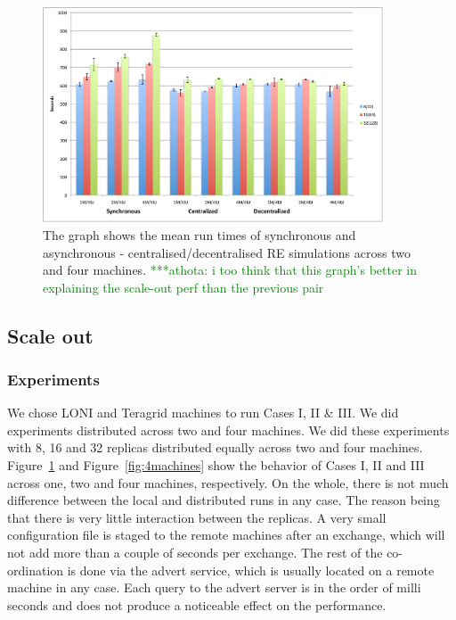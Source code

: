 \documentclass{rspublic}
\newcommand{\athotanote}[1]{ {\textcolor{green} { ***athota: #1 }}}
\newcommand{\athotanote}[1]{}
\begin{document}
%
\begin{figure}
\centering
\includegraphics[width=0.9\textwidth]{../data/scaleout.pdf}
\caption{\small The graph shows the mean run times of synchronous and
  asynchronous - centralised/decentralised RE simulations across two
  and four machines.\athotanote{i too think that this graph's better
    in explaining the scale-out perf than the previous pair} }
\label{fig:2machines}
\vspace{-1em}
\end{figure}

\subsection{Scale out}
\subsubsection{Experiments}
We chose LONI and Teragrid machines to run Cases I, II \& III. We did experiments distributed across two and four machines. We did these experiments with 8, 16 and 32 replicas distributed equally across two and four machines. 
Figure~\ref{fig:2machines} and Figure~\ref{fig:4machines} show the behavior of Cases I, II and III across one, two and four machines, respectively. On the whole, there is not much difference between the local and distributed runs in any case. The reason being that there is very little interaction between the replicas. A very small configuration file is staged to the remote machines after an exchange, which will not add more than a couple of seconds per exchange. The rest of the co-ordination is done via the advert service, which is usually located on a remote machine in any case. Each query to the advert server is in the order of milli seconds and does not produce a noticeable effect on the performance. 
\end{document}
